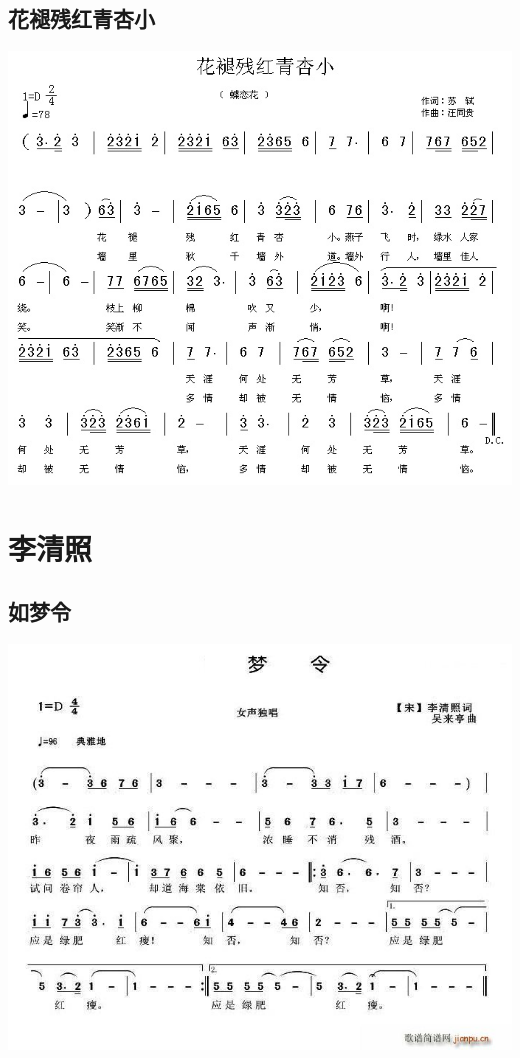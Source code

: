 \documentclass[cn,pad,twocol]{elegantbook}
\begin{document}
\section{花褪残红青杏小}
    \includegraphics[width=\textwidth]{dongxiao/20200801-苏轼-花褪残红青杏小} 
   
\chapter{李清照}
\section{如梦令}
    \includegraphics[width=\textwidth]{dongxiao/20200808-如梦令-李清照.jpg}
\end{document}
